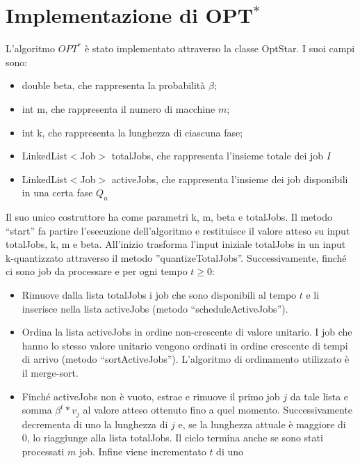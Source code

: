 \documentclass[twoside,openany,titlepage,fleqn,
	headinclude,12pt,a4paper,BCOR5mm,footinclude]{scrbook}
\begin{document}
\section{Implementazione di OPT$^{*}$}
L’algoritmo $OPT^{*}$ è stato implementato attraverso la classe OptStar. I suoi campi sono:
\begin{itemize}
\item{double beta, che rappresenta la probabilità $\beta$;}
\item{int m, che rappresenta il numero di macchine $m$;}
\item{int k, che rappresenta la lunghezza di ciascuna fase;}
\item{LinkedList$<$Job$>$ totalJobs, che rappresenta l’insieme totale dei job $I$}
\item{LinkedList$<$Job$>$ activeJobs, che rappresenta l’insieme dei job disponibili in una certa fase $Q_{n}$}
\end{itemize}
Il suo unico costruttore ha come parametri k, m, beta e totalJobs. Il metodo “start” fa partire l’esecuzione dell’algoritmo e restituisce il valore atteso su input totalJobs, k, m e beta. All'inizio trasforma l'input iniziale totalJobs in un input k-quantizzato attraverso il metodo ''quantizeTotalJobs''. Successivamente, finché ci sono job da processare e per ogni tempo $t \geq 0$:
\begin{itemize}
\item{Rimuove dalla lista totalJobs i job che sono disponibili al tempo $t$ e li inserisce nella lista activeJobs (metodo “scheduleActiveJobs”).}
\item{Ordina la lista activeJobs in ordine non-crescente di valore unitario. I job che hanno lo stesso valore unitario  vengono ordinati in ordine crescente di tempi di arrivo (metodo “sortActiveJobs”). L’algoritmo di ordinamento utilizzato è il merge-sort.}
\item{Finché activeJobs non è vuoto, estrae e rimuove il primo job $j$ da tale lista e somma $\beta^{t} * v_{j}$ al valore atteso ottenuto fino a quel momento. Successivamente decrementa di uno la lunghezza di $j$ e, se la lunghezza attuale è maggiore di 0, lo riaggiunge alla lista totalJobs. Il ciclo termina anche se sono stati processati $m$ job. Infine viene incrementato $t$ di uno}
\end{itemize}
\end{document}
